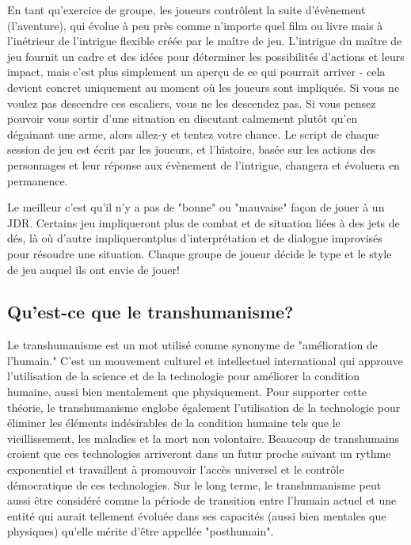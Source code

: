 En tant qu'exercice de groupe, les joueurs contrôlent la suite d'évènement (l'aventure), qui évolue à peu près comme n'importe quel film ou livre mais à l'inétrieur de l'intrigue flexible créée par le maître de jeu. L'intrigue du maître de jeu fournit un cadre et des idées pour déterminer les possibilités d'actions et leurs impact, mais c'est plus simplement un aperçu de ce qui pourrait arriver - cela devient concret uniquement au moment où les joueurs sont impliqués. Si vous ne voulez pas descendre ces escaliers, vous ne les descendez pas. Si vous pensez pouvoir vous sortir d'une situation en discutant calmement plutôt qu'en dégainant une arme, alors allez-y et tentez votre chance. Le script de chaque session de jeu est écrit par les joueurs, et l'histoire, basée sur les actions des personnages et leur réponse aux évènement de l'intrigue, changera et évoluera en permanence. 

Le meilleur c'est qu'il n'y a pas de "bonne" ou "mauvaise" façon de jouer à un JDR. Certains jeu impliqueront plus de combat et de situation liées à des jets de dés, là où d'autre impliquerontplus d'interprétation et de dialogue improvisés pour résoudre une situation. Chaque groupe de joueur décide le type et le style de jeu auquel ils ont envie de jouer! 



\subsection{Qu'est-ce que le transhumanisme?} \label{sec:what-transhumanism} 

Le transhumanisme est un mot utilisé comme synonyme de "amélioration de l'humain." C'est un mouvement culturel et intellectuel international qui approuve l'utilisation de la science et de la technologie pour améliorer la condition humaine, aussi bien mentalement que physiquement. Pour supporter cette théorie, le transhumanisme englobe également l'utilisation de la technologie pour éliminer les éléments indésirables de la condition humaine tels que le vieillissement, les maladies et la mort non volontaire. Beaucoup de transhumains croient que ces technologies arriveront dans un futur proche suivant un rythme exponentiel et travaillent à promouvoir l'accès universel et le contrôle démocratique de ces technologies. Sur le long terme, le transhumanisme peut aussi être considéré comme la période de transition entre l'humain actuel et une entité qui aurait tellement évoluée dans ses capacités (aussi bien mentales que physiques) qu'elle mérite d'être appellée "posthumain". 

